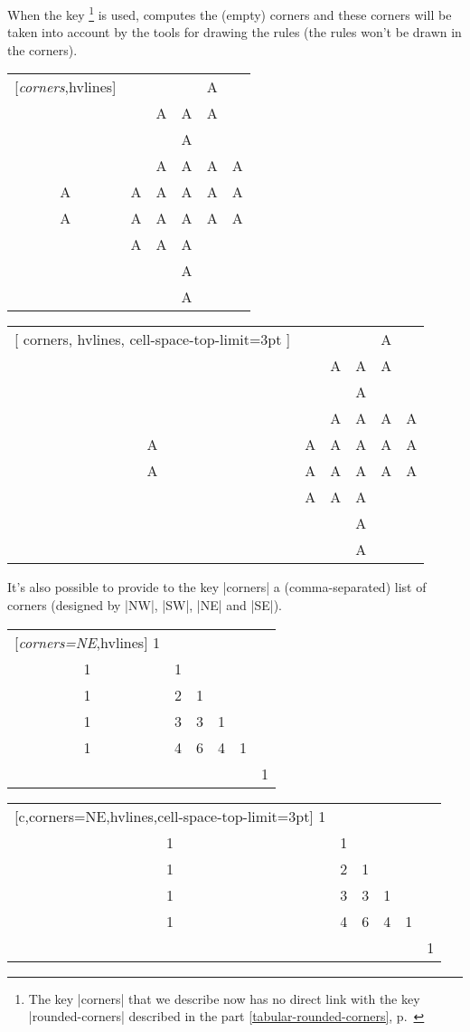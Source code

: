\documentclass[dvipsnames]{article}%
\begin{document}
\bigskip
When the key \footnote{The key |corners| that we describe now
has no direct link with the key |rounded-corners| described in the part
\ref{tabular-rounded-corners}, p.~\pageref{tabular-rounded-corners}} is used,
 computes the (empty) corners and these corners will be taken
into account by the tools for drawing the rules (the rules won't be drawn in
the corners).

\bigskip
\begin{Code}[width=11cm]
\begin{NiceTabular}{*{6}{c}}[\emph{corners},hvlines]
  &   &   &   & A \\
  &   & A & A & A \\
  &   &   & A \\
  &   & A & A & A & A \\
A & A & A & A & A & A \\
A & A & A & A & A & A \\
  & A & A & A \\
  &  & & A \\
  &   &   & A \\
\end{NiceTabular}
\end{Code}
\begin{NiceTabular}{*{6}{c}}%
  [
    corners,
    hvlines,
    cell-space-top-limit=3pt
  ]
  &   &   &   & A \\
  &   & A & A & A \\
  &   &   & A \\
  &   & A & A & A & A \\
A & A & A & A & A & A \\
A & A & A & A & A & A \\
  & A & A & A \\
  &  & & A \\
  &   &   & A \\
\end{NiceTabular}


\bigskip
It's also possible to provide to the key |corners| a (comma-separated) list of
corners (designed by |NW|, |SW|, |NE| and |SE|).

\medskip
\begin{Code}[width=11cm]
\begin{NiceTabular}{*{6}{c}}[\emph{corners=NE},hvlines]
1\\
1&1\\
1&2&1\\
1&3&3&1\\
1&4&6&4&1\\
 & & & & &1
\end{NiceTabular}
\end{Code}
\begin{NiceTabular}{*{6}{c}}%
 [c,corners=NE,hvlines,cell-space-top-limit=3pt]
1\\
1&1\\
1&2&1\\
1&3&3&1\\
1&4&6&4&1\\
 & & & & &1
\end{NiceTabular}
\end{document}
